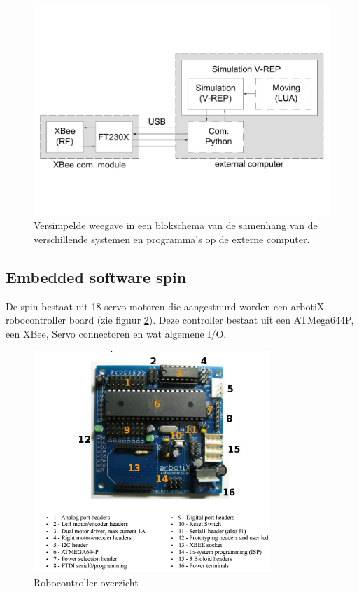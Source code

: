 \documentclass[10pt,a4paper]{article}
\begin{document}
\begin{figure}[h]
    \centering
    \includegraphics[width=1\textwidth]{blockschematic-computer}
    \caption{Versimpelde weegave in een blokschema van de samenhang van de verschillende systemen en programma's op de externe computer.}
    \label{fig:blockschematic-computer}
\end{figure}

\subsection{Embedded software spin}
De spin bestaat uit 18 servo motoren die aangestuurd worden een 	arbotiX robocontroller board (zie figuur \ref{fig:robocontroller-overview}). Deze controller bestaat uit een ATMega644P, een XBee, Servo connectoren en wat algemene I/O.
\begin{figure}[h]
    \centering
    \includegraphics[width=0.8\textwidth]{robocontroller-overview.png}
    \caption{Robocontroller overzicht}
    \label{fig:robocontroller-overview}
\end{figure}
\end{document}
